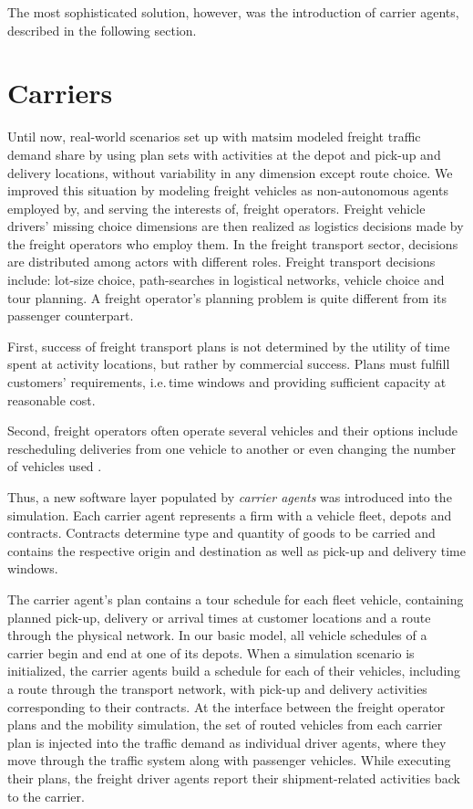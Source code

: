 The most sophisticated solution, however, was the introduction of carrier agents, described in the following section. 

\section{Carriers}
\label{sec:carriers}
Until now, real-world scenarios set up with \gls{matsim} modeled freight traffic demand share by using plan sets with activities at the depot and pick-up and delivery locations, without variability in any dimension except route choice. We improved this situation by modeling freight vehicles as non-autonomous agents employed by, and serving the interests of, freight operators. Freight vehicle drivers' missing choice dimensions are then realized as logistics decisions made by the freight operators who employ them. In the freight transport sector, decisions are distributed among actors with different roles. Freight transport decisions include: lot-size choice, path-searches in logistical networks, vehicle choice and tour planning. A freight operator's planning problem is quite different from its passenger counterpart.

First, success of freight transport plans is not determined by the utility of time
spent at activity locations, but rather by commercial success. Plans must fulfill
customers' requirements, i.e.\,time windows and providing sufficient capacity at
reasonable cost.

Second, freight operators often operate several vehicles and their
options include rescheduling deliveries from one vehicle to another or even changing the
number of vehicles used .

Thus, a new software layer populated by \emph{carrier agents} was introduced into the
simulation. Each carrier agent represents a firm with a vehicle fleet, depots and contracts.
Contracts determine type and quantity of goods to be carried and contains the respective 
origin and destination as well as pick-up and delivery time windows.

The carrier agent's plan contains a tour schedule  for each fleet  vehicle, containing 
planned pick-up, delivery or arrival times at customer locations and a route through 
the physical network. In our basic model, all vehicle schedules of a carrier begin and end at one of its depots.
When a simulation scenario is initialized, the carrier agents build a schedule for each of their vehicles, 
including a route through the transport network, with pick-up and delivery activities corresponding to their contracts.
At the interface between the freight operator plans and the mobility simulation, the set of routed vehicles 
from each carrier plan is injected into the traffic demand as individual driver agents, where they move 
through the traffic system along with passenger vehicles. While executing their plans, the freight driver 
agents report their shipment-related activities back to the carrier.

